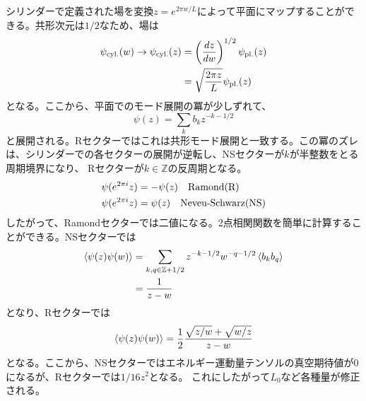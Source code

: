 \documentclass[11pt, aps, longbibliography]{article}
\numberwithin{equation}{section}
\begin{document}
        シリンダーで定義された場を変換$z=e^{2\pi w/L}$によって平面にマップすることができる。共形次元は$1/2$なため、場は
        \begin{align}\label{eq:freefermion6}
            \psi_{\rm cyl.}(w) \rightarrow \psi_{\rm cyl.}(z) &= \left( \frac{dz}{dw} \right)^{1/2}\psi_{\rm pl.}(z) \notag \\
            &= \sqrt{\frac{2\pi z}{L}}\psi_{\rm pl.}(z)
        \end{align}
        となる。ここから、平面でのモード展開の冪が少しずれて、
        \begin{equation}\label{eq:freefermion7}
            \psi(z) = \sum_{k}b_k z^{-k-1/2}
        \end{equation}
        と展開される。Rセクターではこれは共形モード展開と一致する。この冪のズレは、シリンダーでの各セクターの展開が逆転し、NSセクターが$k$が半整数をとる周期境界になり、
        Rセクターが$k\in \mathbb{Z}$の反周期となる。
        \begin{align}\label{eq:freefermion8}
            &\psi(e^{2\pi i}z) = -\psi(z) \quad \text{Ramond(R)} \\
            &\psi(e^{2\pi i}z) = \psi(z) \quad \text{Neveu-Schwarz(NS)} \notag
        \end{align}
        したがって、Ramondセクターでは二値になる。2点相関関数を簡単に計算することができる。NSセクターでは
        \begin{align}\label{eq:freefermion9}
            \expval{\psi(z)\psi(w)} &= \sum_{k,q\in \mathbb{Z}+1/2}z^{-k-1/2}w^{-q-1/2}\expval{b_kb_q} \notag \\
            &= \frac{1}{z-w}
        \end{align}
        となり、Rセクターでは
        \begin{equation}\label{eq:freefermion10}
            \expval{\psi(z)\psi(w)} = \frac{1}{2} \frac{\sqrt{z/w} + \sqrt{w/z}}{z-w}
        \end{equation}
        となる。ここから、NSセクターではエネルギー運動量テンソルの真空期待値が0になるが、Rセクターでは$1/16z^2$となる。
        これにしたがって$L_0$など各種量が修正される。
    
\end{document}
